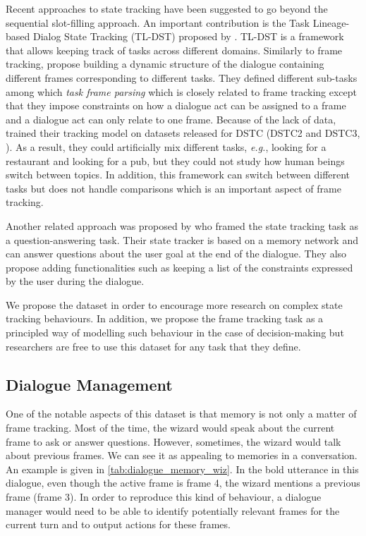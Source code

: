 \documentclass{article}
\theoremstyle{definition}
\begin{document}
Recent approaches to state tracking have been suggested to go beyond the sequential slot-filling approach. An important contribution is the Task Lineage-based Dialog State Tracking (TL-DST) proposed by \citep{Lee:16}. TL-DST is a framework that allows keeping track of tasks across different domains. Similarly to frame tracking, \citeauthor{Lee:16} propose building a dynamic structure of the dialogue containing different frames corresponding to different tasks. They defined different sub-tasks among which \textit{task frame parsing} which is closely related to frame tracking except that they impose constraints on how a dialogue act can be assigned to a frame and a dialogue act can only relate to one frame. Because of the lack of data, \citet{Lee:16} trained their tracking model on datasets released for DSTC (DSTC2 and DSTC3, \citealp{Henderson:14,Henderson:14c}). As a result, they could artificially mix different tasks, \textit{e.g.}, looking for a restaurant and looking for a pub, but they could not study how human beings switch between topics. In addition, this framework can switch between different tasks but does not handle comparisons which is an important aspect of frame tracking. 

Another related approach was proposed by \citep{Perez:16} who framed the state tracking task as a question-answering task. Their state tracker is based on a memory network \citep{weston:14} and can answer questions about the user goal at the end of the dialogue. They also propose adding functionalities such as keeping a list of the constraints expressed by the user during the dialogue. 

We propose the dataset in order to encourage more research on complex state tracking behaviours. In addition, we propose the frame tracking task as a principled way of modelling such behaviour in the case of decision-making but researchers are free to use this dataset for any task that they define.

\subsection{Dialogue Management}
One of the notable aspects of this dataset is that memory is not only a matter of frame tracking. Most of the time, the wizard would speak about the current frame to ask or answer questions. However, sometimes, the wizard would talk about previous frames. We can see it as appealing to memories in a conversation. An example is given in \cref{tab:dialogue_memory_wiz}. In the bold utterance in this dialogue, even though the active frame is frame 4, the wizard mentions a previous frame (frame 3). In order to reproduce this kind of behaviour, a dialogue manager would need to be able to identify potentially relevant frames for the current turn and to output actions for these frames.
\end{document}
